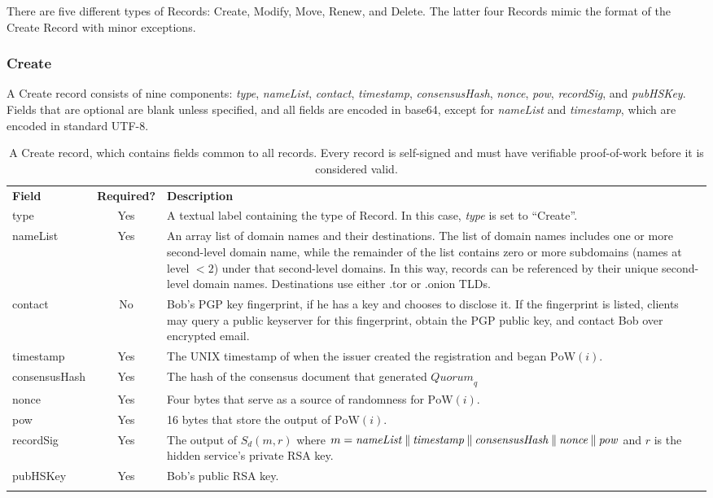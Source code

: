 There are five different types of Records: Create, Modify, Move, Renew, and Delete. The latter four Records mimic the format of the Create Record with minor exceptions.

\subsubsection{Create}

A Create record consists of nine components: \emph{type}, \emph{nameList}, \emph{contact}, \emph{timestamp}, \emph{consensusHash}, \emph{nonce}, \emph{pow}, \emph{recordSig}, and \emph{pubHSKey}. Fields that are optional are blank unless specified, and all fields are encoded in base64, except for \emph{nameList} and \emph{timestamp}, which are encoded in standard UTF-8.

\renewcommand{\arraystretch}{1.75} %
\begin{center}
    \begin{longtabu}{ | l | c | p{9.5cm} |}
    \hline
    \textbf{Field} & \textbf{Required?} & \textbf{Description} \\
    type & Yes & A textual label containing the type of Record. In this case, \emph{type} is set to ``Create''. \\
    nameList & Yes & An array list of domain names and their destinations. The list of domain names includes one or more second-level domain name, while the remainder of the list contains zero or more subdomains (names at level $ < 2 $) under that second-level domains. In this way, records can be referenced by their unique second-level domain names. Destinations use either .tor or .onion TLDs. \\
    contact & No & Bob's PGP key fingerprint, if he has a key and chooses to disclose it. If the fingerprint is listed, clients may query a public keyserver for this fingerprint, obtain the PGP public key, and contact Bob over encrypted email. \\
    timestamp & Yes & The UNIX timestamp of when the issuer created the registration and began $ \mathrm{PoW}(i) $. \\
    consensusHash & Yes & The hash of the consensus document that generated $ \mathit{Quorum}_{q} $ \\
    nonce & Yes & Four bytes that serve as a source of randomness for $ \mathrm{PoW}(i) $. \\
   	pow & Yes & 16 bytes that store the output of $ \mathrm{PoW}(i) $. \\
   	recordSig & Yes & The output of $ S_{d}(m, r) $ where $ m = \mathit{nameList} \mathbin{\|} \mathit{timestamp} \mathbin{\|} \mathit{consensusHash} \mathbin{\|} \mathit{nonce} \mathbin{\|} \mathit{pow} $ and $ r $ is the hidden service's private RSA key. \\
   	pubHSKey & Yes & Bob's public RSA key. \\
    \hline
    \caption{A Create record, which contains fields common to all records. Every record is self-signed and must have verifiable proof-of-work before it is considered valid.}
    \end{longtabu}
\end{center}

